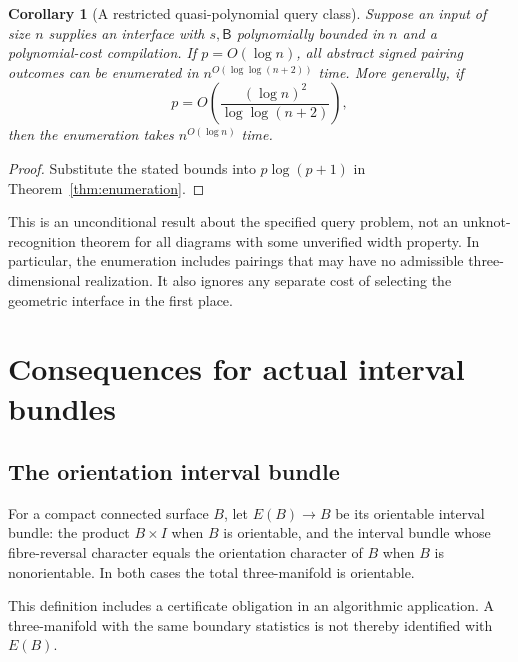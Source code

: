 \documentclass[11pt]{article}
\newtheorem{corollary}[theorem]{Corollary}
\theoremstyle{definition}
\theoremstyle{remark}\newtheorem{remark}[theorem]{Remark}
\newcommand{\bits}{\mathsf B}
\begin{document}
\begin{corollary}[A restricted quasi-polynomial query class]\label{cor:qp}
Suppose an input of size $n$ supplies an interface with $s,\bits$ polynomially bounded in $n$ and a polynomial-cost compilation. If $p=O(\log n)$, all abstract signed pairing outcomes can be enumerated in $n^{O(\log\log(n+2))}$ time. More generally, if
\[
            p=O\!\left(\frac{(\log n)^2}{\log\log(n+2)}\right),
\]
then the enumeration takes $n^{O(\log n)}$ time.
\end{corollary}
\begin{proof}
Substitute the stated bounds into $p\log(p+1)$ in Theorem~\ref{thm:enumeration}.
\end{proof}

This is an unconditional result about the specified query problem, not an unknot-recognition theorem for all diagrams with some unverified width property. In particular, the enumeration includes pairings that may have no admissible three-dimensional realization. It also ignores any separate cost of selecting the geometric interface in the first place.

\section{Consequences for actual interval bundles}
\label{sec:bundles}

\subsection{The orientation interval bundle}
For a compact connected surface $B$, let $E(B)\to B$ be its orientable interval bundle: the product $B\times I$ when $B$ is orientable, and the interval bundle whose fibre-reversal character equals the orientation character of $B$ when $B$ is nonorientable. In both cases the total three-manifold is orientable.

This definition includes a certificate obligation in an algorithmic application. A three-manifold with the same boundary statistics is not thereby identified with $E(B)$.
\end{document}
